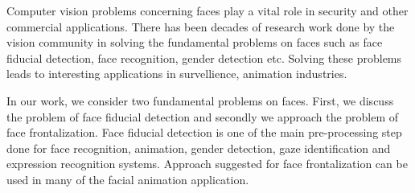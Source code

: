 % 
% 
% 
Computer vision problems concerning faces play a vital role in security and other commercial applications. 
There has been decades of research work done by the vision community in solving the fundamental problems
on faces such as face fiducial detection, face recognition, gender detection etc. Solving these problems
leads to interesting applications in survellience, animation industries. 

In our work, we consider two fundamental problems on faces. First, we discuss the problem of face fiducial
detection and secondly we approach the problem of face frontalization. Face fiducial detection is one of 
the main pre-processing step done for face recognition, animation, gender detection, gaze identification
and expression recognition systems. Approach suggested for face frontalization can be used in many of the 
facial animation application.

